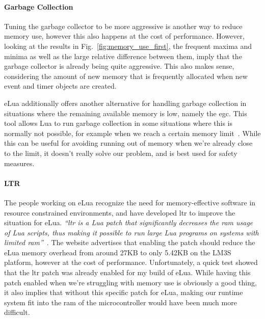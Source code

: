 \paragraph{Garbage Collection} Tuning the garbage collector to be more aggressive is another way to reduce memory use, however this also happens at the cost of performance. However, looking at the results in Fig.~\ref{fig:memory_use_first}, the frequent maxima and minima as well as the large relative difference between them, imply that the garbage collector is already being quite aggressive. This also makes sense, considering the amount of new memory that is frequently allocated when new event and timer objects are created.

\noindent
eLua additionally offers another alternative for handling garbage collection in situations where the remaining available memory is low, namely the \gls{egc}. This tool allows Lua to run garbage collection in some situations where this is normally not possible, for example when we reach a certain memory limit~\cite{website:elua_egc}. While this can be useful for avoiding running out of memory when we're already close to the limit, it doesn't really solve our problem, and is best used for safety measures.

\paragraph{LTR} The people working on eLua recognize the need for memory-effective software in resource constrained environments, and have developed \gls{ltr} to improve the situation for eLua. \emph{``\gls{ltr} is a Lua patch that significantly decreases the \gls{ram} usage of Lua scripts, thus making it possible to run large Lua programs on systems with limited \gls{ram}''}~\cite{website:elua_ltr}. The website advertises that enabling the patch should reduce the eLua memory overhead from around 27KB to only 5.42KB on the LM3S platform, however at the cost of performance. Unfortunately, a quick test showed that the \gls{ltr} patch was already enabled for my build of eLua. While having this patch enabled when we're struggling with memory use is obviously a good thing, it also implies that without this specific patch for eLua, making our runtime system fit into the \gls{ram} of the microcontroller would have been much more difficult.

